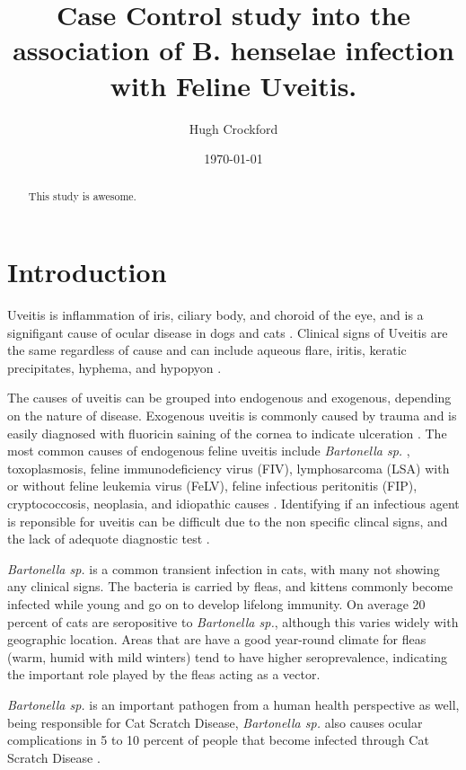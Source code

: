\documentclass[11pt,twocolumn]{article}
\title{Case Control study into the association of B. henselae infection with Feline Uveitis.}
\author{Hugh Crockford}
\date{\today}
\begin{document}
	\maketitle

\begin{abstract}
	This study is awesome.
\end{abstract}

	\section{Introduction}
		Uveitis is inflammation of iris, ciliary body, and choroid of the eye, and is a signifigant cause of ocular disease in dogs and cats \cite{Townsend2008}. 
		Clinical signs of Uveitis are the same regardless of cause and can include aqueous flare, iritis, keratic precipitates, hyphema, and hypopyon \cite{Powell2010}.


		The causes of uveitis can be grouped into endogenous and exogenous, depending on the nature of disease. Exogenous uveitis is commonly caused by trauma and is easily diagnosed with fluoricin saining of the cornea to indicate ulceration \cite{Fontenelle2008}.
		The most common causes of endogenous feline uveitis include \emph{Bartonella sp.} , toxoplasmosis, feline immunodeficiency virus (FIV), lymphosarcoma (LSA) with or without feline leukemia virus (FeLV), feline infectious peritonitis (FIP), cryptococcosis, neoplasia, and idiopathic causes \cite{Powell2001}.
		Identifying if an infectious agent is reponsible for uveitis can be difficult due to the non specific clincal signs, and the lack of adequote diagnostic test \cite{Fontenelle2008}.


		\emph{Bartonella sp.} is a common transient infection in cats, with many not showing any clinical signs. 
		The bacteria is carried by fleas, and kittens commonly become infected while young and go on to develop lifelong immunity.
		On average 20 percent of cats are seropositive to \emph{Bartonella sp.}, although this varies widely with geographic location\cite{Jameson1995a}. Areas that are have a good year-round climate for fleas (warm, humid with mild winters) tend to have higher seroprevalence, indicating the important role played by the fleas acting as a vector.


		\emph{Bartonella sp.} is an important pathogen from a human health perspective as well, being responsible for Cat Scratch Disease, 
		\emph{Bartonella sp.} also causes ocular complications in 5 to 10 percent of people that become infected through Cat Scratch Disease \cite{Wade2000}.
	
\end{document}

